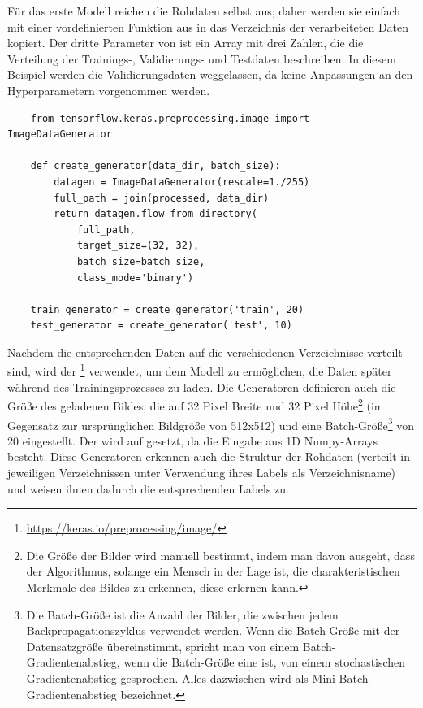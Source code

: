 Für das erste Modell reichen die Rohdaten selbst aus; daher werden sie einfach mit einer vordefinierten Funktion  aus  in das Verzeichnis der verarbeiteten Daten kopiert.
Der dritte Parameter von  ist ein Array mit drei Zahlen, die die Verteilung der Trainings-, Validierungs- und Testdaten beschreiben.
In diesem Beispiel werden die Validierungsdaten weggelassen, da keine Anpassungen an den Hyperparametern vorgenommen werden.

\begin{lstlisting}
    from tensorflow.keras.preprocessing.image import ImageDataGenerator
    
    def create_generator(data_dir, batch_size):
        datagen = ImageDataGenerator(rescale=1./255)
        full_path = join(processed, data_dir)
        return datagen.flow_from_directory(
            full_path,
            target_size=(32, 32),
            batch_size=batch_size,
            class_mode='binary')
    
    train_generator = create_generator('train', 20)
    test_generator = create_generator('test', 10)
\end{lstlisting}

Nachdem die entsprechenden Daten auf die verschiedenen Verzeichnisse verteilt sind, wird der \footnote{\url{https://keras.io/preprocessing/image/}} verwendet, um dem Modell zu ermöglichen, die Daten später während des Trainingsprozesses zu laden.
Die Generatoren definieren auch die Größe des geladenen Bildes, die auf 32 Pixel Breite und 32 Pixel Höhe\footnote{Die Größe der Bilder wird manuell bestimmt, indem man davon ausgeht, dass der Algorithmus, solange ein Mensch in der Lage ist, die charakteristischen Merkmale des Bildes zu erkennen, diese erlernen kann.} (im Gegensatz zur ursprünglichen Bildgröße von 512x512) und eine Batch-Größe\footnote{Die Batch-Größe ist die Anzahl der Bilder, die zwischen jedem Backpropagationszyklus verwendet werden.
Wenn die Batch-Größe mit der Datensatzgröße übereinstimmt, spricht man von einem Batch-Gradientenabstieg, wenn die Batch-Größe eine ist, von einem stochastischen Gradientenabstieg gesprochen.
Alles dazwischen wird als Mini-Batch-Gradientenabstieg bezeichnet.} von 20 eingestellt.
Der  wird auf  gesetzt, da die Eingabe aus 1D Numpy-Arrays besteht.
Diese Generatoren erkennen auch die Struktur der Rohdaten (verteilt in jeweiligen Verzeichnissen unter Verwendung ihres Labels als Verzeichnisname) und weisen ihnen dadurch die entsprechenden Labels zu.

